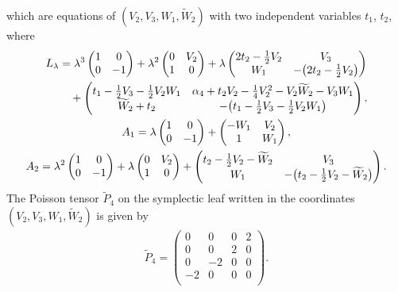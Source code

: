 \documentclass[10pt,a4paper]{amsart}
\numberwithin{equation}{section}
\begin{document}
which are equations of $(V_2,V_3,W_1,\widetilde{W}_2)$ with two independent variables $t_1$, $t_2$, where
\begin{gather*}
L_\lambda = \lambda ^3 \left(
\begin{matrix}
1 & 0 \\
0 & -1
\end{matrix}
\right) + \lambda^2 \left(
\begin{matrix}
0 & V_2 \\
1 & 0
\end{matrix}
\right) + \lambda \left(
\begin{matrix}
2t_2-\frac{1}{2}V_2 & V_3 \\
W_1 & -\big(2t_2-\frac{1}{2}V_2\big)
\end{matrix}
\right) \\
\hphantom{L_\lambda =}{} + \left(
\begin{matrix}
t_1-\frac{1}{2}V_3-\frac{1}{2}V_2W_1 & \alpha _4 + t_2V_2 - \frac{1}{4}V_2^2 - V_2\widetilde{W}_2 - V_3W_1 \\
\widetilde{W}_2+t_2 & -\big(t_1-\frac{1}{2}V_3-\frac{1}{2}V_2W_1\big)
\end{matrix}
\right), \\
A_1 = \lambda \left(
\begin{matrix}
1 & 0 \\
0 & -1
\end{matrix}
\right) + \left(
\begin{matrix}
-W_1 & V_2 \\
1 & W_1
\end{matrix}
\right), \\
A_2 = \lambda^2 \left(
\begin{matrix}
1 & 0 \\
0 & -1
\end{matrix}
\right) + \lambda \left(
\begin{matrix}
0 & V_2 \\
1 & 0
\end{matrix}
\right) +\left(
\begin{matrix}
t_2-\frac{1}{2}V_2-\widetilde{W}_2 & V_3 \\
W_1 & -\big(t_2-\frac{1}{2}V_2-\widetilde{W}_2\big)
\end{matrix}
\right).
\end{gather*}
The Poisson tensor $\widetilde{P}_4$ on the symplectic leaf written in the coordinates $(V_2,V_3,W_1,\widetilde{W}_2)$ is given by
\begin{gather*}
\widetilde{P}_4 = \left(
\begin{matrix}
0 &0 &0 &2 \\
0&0 &2 &0 \\
0&-2 &0 &0 \\
-2&0 &0 &0 \\
\end{matrix}
\right).
\end{gather*}
\end{document}
